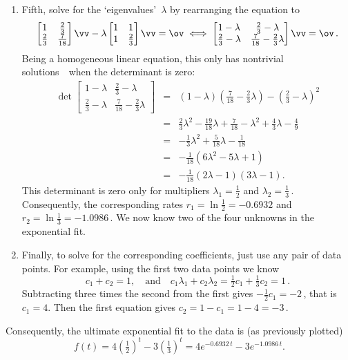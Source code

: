 \begin{draft}
\begin{example}
\begin{solution}
\begin{enumerate}
\item \label{eg:2expfite}
Fifth, solve for the `eigenvalues'~\(\lambda\) by rearranging the equation to
\begin{equation*}
\begin{bmatrix} 1&\tfrac23\\\tfrac23&\frac7{18} \end{bmatrix}\vv-\lambda\begin{bmatrix} 1&1\\1&\tfrac23 \end{bmatrix}\vv=\ov
\iff
\begin{bmatrix} 1-\lambda&\tfrac23-\lambda\\\tfrac23-\lambda&\frac7{18}-\tfrac23\lambda\end{bmatrix}\vv=\ov\,.
\end{equation*}
Being a homogeneous linear equation, this only has nontrivial solutions~\vv\ when the determinant is zero:
\begin{eqnarray*}
\det\begin{bmatrix} 1-\lambda&\tfrac23-\lambda\\\tfrac23-\lambda&\frac7{18}-\tfrac23\lambda\end{bmatrix}
&=&(1-\lambda)(\tfrac7{18}-\tfrac23\lambda)-(\tfrac23-\lambda)^2
\\&=&\tfrac23\lambda^2-\tfrac{19}{18}\lambda+\tfrac7{18}
-\lambda^2+\tfrac43\lambda-\tfrac49
\\&=&-\tfrac13\lambda^2+\tfrac5{18}\lambda-\tfrac1{18}
\\&=&-\tfrac1{18}(6\lambda^2-5\lambda+1)
\\&=&-\tfrac1{18}(2\lambda-1)(3\lambda-1).
\end{eqnarray*}
This determinant is zero only for multipliers \(\lambda_1=\tfrac12\) and \(\lambda_2=\tfrac13\)\,. 
Consequently, the corresponding rates \(r_1=\ln\tfrac12=-0.6932\) and \(r_2=\ln\tfrac13=-1.0986\)\,.
We now know two of the four unknowns in the exponential fit.

\item \label{eg:2expfitf}
Finally, to solve for the corresponding coefficients, just use any pair of data points.
For example, using the first two data points we know
\begin{equation*}
c_1+c_2=1,\quad\text{and}\quad
c_1\lambda_1+c_2\lambda_2=\tfrac12c_1+\tfrac13c_2=1\,.
\end{equation*}
Subtracting three times the second from the first gives \(-\tfrac12c_1=-2\)\,, that is \(c_1=4\).
Then the first equation gives \(c_2=1-c_1=1-4=-3\)\,.
\end{enumerate}
Consequently, the ultimate exponential fit to the data is (as previously plotted)
\begin{equation*}
f(t)=4(\tfrac12)^t-3(\tfrac13)^t
=4e^{-0.6932\,t}-3e^{-1.0986\,t}.
\end{equation*}
\end{solution}
\end{example}



\end{draft}
